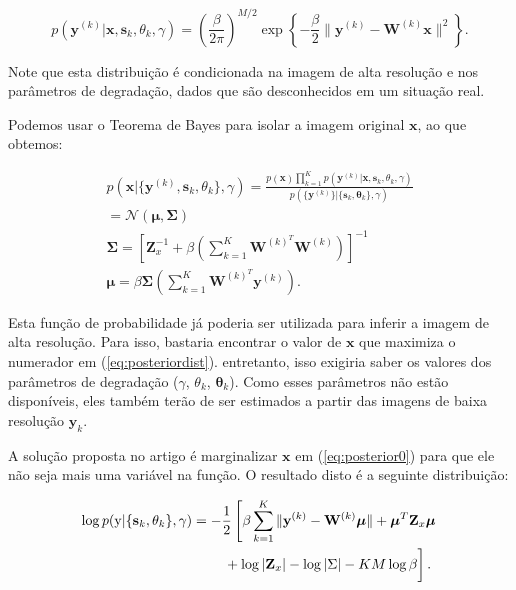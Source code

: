 \begin{equation}
	\label{eq:posterior0}
	p(\mathbf{y}^{(k)} | \mathbf{x}, \mathbf{s}_k, \theta_k, \gamma) = 
	\left(\frac{\beta}{2\pi}\right)^{M/2}
	\exp \left\{ -\frac{\beta}{2} \| \mathbf{y}^{(k)} - \mathbf{W}^{(k)} \mathbf{x} \|^2 \right\}.
\end{equation}

Note que esta distribuição é condicionada na imagem de alta resolução e nos parâmetros de degradação, dados que são desconhecidos em um situação real.

Podemos usar o Teorema de Bayes para isolar a imagem original $\mathbf{x}$, ao que obtemos:

\begin{gather}
	\label{eq:posteriordist}
	p(\mathbf{x}|\{\mathbf{y}^{(k)},\mathbf{s}_k,\theta_k\}, \gamma) = 
	\frac{p(\mathbf{x})\prod^K_{k=1} p(\mathbf{y}^{(k)}|\mathbf{x},\mathbf{s}_k,\theta_k, \gamma)}
	{p(\{\mathbf{y}^{(k)}\}|\{\mathbf{s}_k,\mathbf{\theta}_k\},\gamma)} \\
	= \mathcal{N}(\boldsymbol{\mu},\mathbf{\Sigma}) \\
	\mathbf{ \Sigma }= \left[\mathbf{Z}^{-1}_x + \beta \left( \sum^K_{k = 1} \mathbf{W}^{(k)^T} \mathbf{W}^{(k)} \right) \right]^{-1} \\
	\boldsymbol{\mu} = \beta \mathbf{ \Sigma } \left( \sum^K_{k=1} \mathbf{W}^{(k)^T}\mathbf{y}^{(k)} \right).
\end{gather}

Esta função de probabilidade já poderia ser utilizada para inferir a imagem de alta resolução.
Para isso, bastaria encontrar o valor de $\mathbf{x}$ que maximiza o numerador em (\ref{eq:posteriordist}). entretanto, isso exigiria saber os valores dos parâmetros de degradação ($\gamma$, $\theta_k$, $\mathbf{\theta}_k$).
Como esses parâmetros não estão disponíveis, eles também terão de ser estimados a partir das imagens de baixa resolução $\mathbf{y}_k$. 

A solução proposta no artigo é marginalizar $\mathbf{x}$ em (\ref{eq:posterior0}) para que ele não seja mais uma variável na função. O resultado disto é a seguinte distribuição:

\begin{align}
	\label{eq:parameter}
	\log p(\mathrm{y}|\{\mathbf{s}_k,\theta_k\}, \gamma) &= -\frac{1}{2}\left[\beta \sum^K_{k=1} \|\mathbf{y}^{(k)} - \mathbf{W}^{(k)}\boldsymbol{\mu}\|
    + \boldsymbol{\mu}^T\mathbf{Z}_x \boldsymbol{\mu} \right. \nonumber \\
    &\qquad \left.\vphantom{\int_t} + \log |\mathbf{Z}_x| - \log{|\Sigma |} - KM \log \beta \right].
\end{align}

